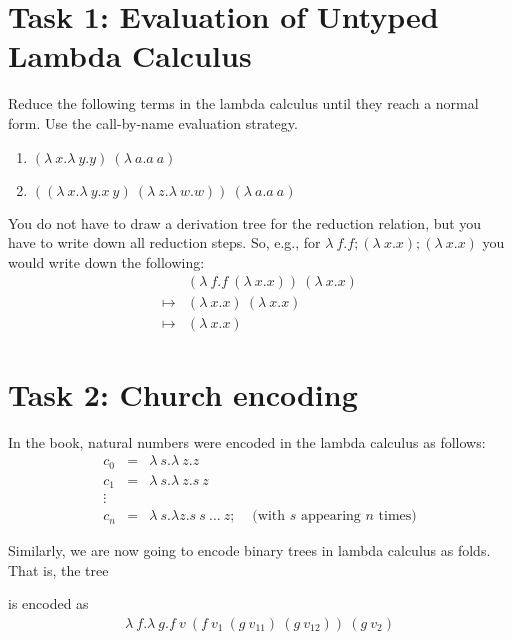 \section*{Task 1: Evaluation of Untyped Lambda Calculus}

Reduce the following terms in the lambda calculus until they reach a normal form.
Use the call-by-name evaluation strategy.

\begin{enumerate}
  \item $(\lambda\ x.\lambda\ y.y)\ (\lambda\ a.a\ a)$ 
  \item $((\lambda\ x. \lambda\ y.x\ y)\ (\lambda\ z.\lambda\ w.w))\ (\lambda\ a.a\ a) $
\end{enumerate}

You do not have to draw a derivation tree for the reduction relation, but you have to write down all
reduction steps. So, e.g., for $\lambda\ f.f;(\lambda\ x.x);(\lambda\ x.x)$
you would write down the following:
\begin{align*}
  & (\lambda\ f.f\ (\lambda\ x.x))\ (\lambda\ x.x) \\
  \mapsto &  (\lambda\ x.x)\ (\lambda\ x.x)\\
  \mapsto & (\lambda\ x.x)
\end{align*}

\section*{Task 2: Church encoding}
In the book, natural numbers were encoded in the lambda calculus as follows:
\begin{align*}
  c_0 & = & \lambda\ s. \lambda\ z.z\\
  c_1 & = & \lambda\ s. \lambda\ z.s\ z\\
  \vdots\\
  c_n & = & \lambda\ s. \lambda z. s\ s\ \dots\ z; & \text{ (with $s$ appearing $n$ times)}
\end{align*}

Similarly, we are now going to encode binary trees in lambda calculus as folds.
That is, the tree
\begin{center}
\end{center}
is encoded as
\begin{align*}
  \lambda\ f.\lambda\ g.f\ v\ (f\ v_1\ (g\ v_{11})\ (g\ v_{12}))\ (g\ v_2)
\end{align*}

